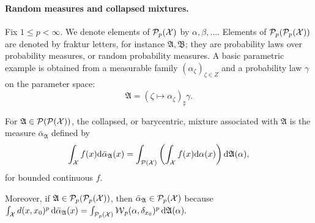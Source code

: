 \paragraph{Random measures and collapsed mixtures.}
Fix $1\leq p<\infty$. We denote elements of $\mathcal{P}_p(\mathcal{X})$ by $\alpha,\beta,\ldots$. Elements of $\mathcal{P}_p(\mathcal{P}_p(\mathcal{X}))$ are denoted by fraktur letters, for instance $\mathfrak A,\mathfrak B$; they are probability laws over probability measures, or random probability measures. A basic parametric example is obtained from a measurable family $(\alpha_\zeta)_{\zeta\in Z}$ and a probability law $\gamma$ on the parameter space:
\begin{equation}\label{eq-wow-parametric-law}
\mathfrak A=(\zeta\mapsto\alpha_\zeta)_\sharp\gamma.
\end{equation}
\begin{defn}\label{def-collapsed-barycentric-mixture}
For $\mathfrak A\in\mathcal{P}(\mathcal{P}(\mathcal{X}))$, the collapsed, or barycentric, mixture associated with $\mathfrak A$ is the measure $\bar\alpha_{\mathfrak A}$ defined by
\begin{equation}\label{eq-wow-barycentric-mixture}
\int_{\mathcal{X}} f(x)\mathrm{d}\bar\alpha_{\mathfrak A}(x)
=
\int_{\mathcal{P}(\mathcal{X})}
\left(\int_{\mathcal{X}} f(x)\mathrm{d}\alpha(x)\right)
\mathrm{d}\mathfrak A(\alpha),
\end{equation}
for bounded continuous $f$.
\end{defn}
Moreover, if $\mathfrak A\in\mathcal{P}_p(\mathcal{P}_p(\mathcal{X}))$, then $\bar\alpha_{\mathfrak A}\in\mathcal{P}_p(\mathcal{X})$ because
\(\int_{\mathcal{X}} d(x,x_0)^p\,\mathrm{d}\bar\alpha_{\mathfrak A}(x) = \int_{\mathcal{P}_p(\mathcal{X})}\operatorname{\mathcal{W}}_p(\alpha,\delta_{x_0})^p\,\mathrm{d}\mathfrak A(\alpha).\)

